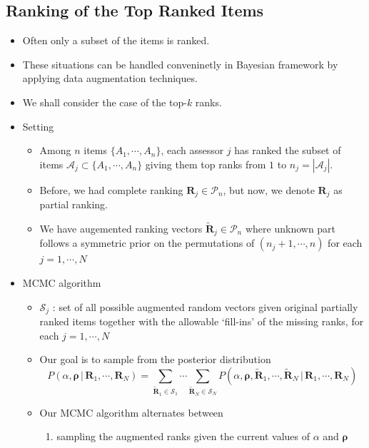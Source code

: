 \documentclass[12pt]{article}
\begin{document}
\subsection{Ranking of the Top Ranked Items}
\begin{itemize}
    \item Often only a subset of the items is ranked.
    \item These situations can be handled conveninetly in Bayesian framework by applying data augmentation techniques.
    \item We shall consider the case of the top-$k$ ranks.
    \item Setting 
    \begin{itemize}
        \item Among $n$ items $\{A_1, \cdots, A_n\}$, each assessor $j$ has ranked the subset of items $\mathcal{A}_j\subset\{A_1, \cdots, A_n\}$ giving them top ranks from $1$ to $n_j=|\mathcal{A}_j|$. 
        \item Before, we had complete ranking $\mathbf{R}_j\in \mathcal{P}_n$, but now, we denote $\mathbf{R}_j$ as partial ranking.
        \item We have augemented ranking vectors $\tilde{\mathbf{R}}_j\in \mathcal{P}_n$ where unknown part follows a symmetric prior on the permutations of $(n_j+1, \cdots, n)$ for each $j=1, \cdots, N$
    \end{itemize}
    \item MCMC algorithm
    \begin{itemize}
        \item $\mathcal{S}_j$ : set of all possible augmented random vectors given original partially ranked items together with the allowable `fill-ins' of the missing ranks, for each $j=1, \cdots, N$
        \item Our goal is to sample from the posterior distribution \begin{equation*}
            P(\alpha, \boldsymbol{\rho}\, |\, \mathbf{R}_1, \cdots, \mathbf{R}_N)=\sum_{\tilde{\mathbf{R}}_1\in \mathcal{S}_1}\cdots \sum_{\tilde{\mathbf{R}}_N\in \mathcal{S}_N}P(\alpha, \boldsymbol{\rho}, \tilde{\mathbf{R}}_1, \cdots,\tilde{\mathbf{R}}_N\, |\, \mathbf{R}_1, \cdots, \mathbf{R}_N )
        \end{equation*}
        \item Our MCMC algorithm alternates between
        \begin{enumerate}
            \item  sampling the augmented ranks given the current values of $\alpha$ and $\boldsymbol{\rho}$

\end{enumerate}
\end{itemize}
\end{itemize}
\end{document}
